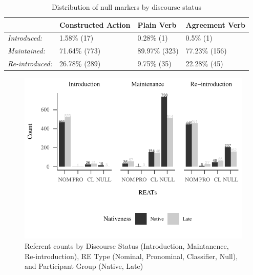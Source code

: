 \documentclass[]{elsarticle} %
\begin{document}
\begin{table}
\small
\caption{Distribution of null markers by discourse status}
\label{tab:my-table5}
\begin{tabular}{llll}
\hline
                        & Constructed Action & Plain Verb    & Agreement Verb \\ \hline
\textit{Introduced:}    & 1.58\% (17)        & 0.28\% (1)    & 0.5\% (1)      \\
\textit{Maintained:}    & 71.64\% (773)      & 89.97\% (323) & 77.23\% (156)  \\
\textit{Re-introduced:} & 26.78\% (289)      & 9.75\% (35)   & 22.28\% (45)   \\ \hline
\end{tabular}
\end{table}

\begin{figure}
\centering
\includegraphics{manuscript_v2_files/figure-latex/fig:count-plot-1.pdf}
\caption{Referent counts by Discourse Status (Introduction, Maintanence,
Re-introduction), RE Type (Nominal, Pronominal, Classifier, Null), and
Participant Group (Native, Late)}
\end{figure}
\end{document}
